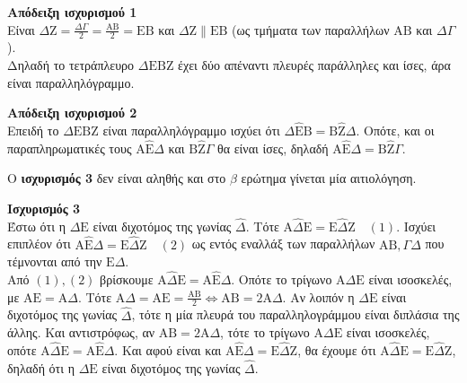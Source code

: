 \begin{alist}
    \item \textbf{Απόδειξη ισχυρισμού 1}\\
    Είναι $\Delta\mathrm{Z} = \frac{\Delta\Gamma}{2} = \frac{\mathrm{A}\mathrm{B}}{2} = \mathrm{E}\mathrm{B}$ και $\Delta\mathrm{Z} \parallel \mathrm{E}\mathrm{B}$ (ως τμήματα των παραλλήλων $\mathrm{A}\mathrm{B}$ και $\Delta\Gamma$).\\
    Δηλαδή το τετράπλευρο $\Delta\mathrm{E}\mathrm{B}\mathrm{Z}$ έχει δύο απέναντι πλευρές παράλληλες και ίσες, άρα είναι παραλληλόγραμμο.
    
    
    \textbf{Απόδειξη ισχυρισμού 2}\\
    Επειδή το $\Delta\mathrm{E}\mathrm{B}\mathrm{Z}$ είναι παραλληλόγραμμο ισχύει ότι $\Delta\hat{\mathrm{E}}\mathrm{B} = \mathrm{B}\hat{\mathrm{Z}}\Delta$. Οπότε, και οι παραπληρωματικές τους $\mathrm{A}\hat{\mathrm{E}}\Delta$ και $\mathrm{B}\hat{\mathrm{Z}}\Gamma$ θα είναι ίσες, δηλαδή $\mathrm{A}\hat{\mathrm{E}}\Delta = \mathrm{B}\hat{\mathrm{Z}}\Gamma$.
    
    Ο \textbf{ισχυρισμός 3} δεν είναι αληθής και στο $\beta$ ερώτημα γίνεται μία αιτιολόγηση.
    
    \item \textbf{Ισχυρισμός 3}\\
    Έστω ότι η $\Delta\mathrm{E}$ είναι διχοτόμος της γωνίας $\hat{\Delta}$. Τότε $\mathrm{A}\hat{\Delta}\mathrm{E} = \mathrm{E}\hat{\Delta}\mathrm{Z} \quad (1)$. Ισχύει επιπλέον ότι $\mathrm{A}\hat{\mathrm{E}}\Delta = \mathrm{E}\hat{\Delta}\mathrm{Z} \quad (2)$ ως εντός εναλλάξ των παραλλήλων $\mathrm{A}\mathrm{B}, \Gamma\Delta$ που τέμνονται από την $\mathrm{E}\Delta$. \\
    Από $(1), (2)$ βρίσκουμε $\mathrm{A}\hat{\Delta}\mathrm{E} = \mathrm{A}\hat{\mathrm{E}}\Delta$. Οπότε το τρίγωνο $\mathrm{A}\Delta\mathrm{E}$ είναι ισοσκελές, με $\mathrm{A}\mathrm{E} = \mathrm{A}\Delta$.
    Τότε $\mathrm{A}\Delta = \mathrm{A}\mathrm{E} = \frac{\mathrm{A}\mathrm{B}}{2} \Leftrightarrow \mathrm{A}\mathrm{B} = 2\mathrm{A}\Delta$. Αν λοιπόν η $\Delta\mathrm{E}$ είναι διχοτόμος της γωνίας $\hat{\Delta}$, τότε η μία πλευρά του παραλληλογράμμου είναι διπλάσια της άλλης. Και αντιστρόφως, αν $\mathrm{A}\mathrm{B} = 2\mathrm{A}\Delta$, τότε το τρίγωνο $\mathrm{A}\Delta\mathrm{E}$ είναι ισοσκελές, οπότε $\mathrm{A}\hat{\Delta}\mathrm{E} = \mathrm{A}\hat{\mathrm{E}}\Delta$. Και αφού είναι και $\mathrm{A}\hat{\mathrm{E}}\Delta = \mathrm{E}\hat{\Delta}\mathrm{Z}$, θα έχουμε ότι $\mathrm{A}\hat{\Delta}\mathrm{E} = \mathrm{E}\hat{\Delta}\mathrm{Z}$, δηλαδή ότι η $\Delta\mathrm{E}$ είναι διχοτόμος της γωνίας $\hat{\Delta}$.
\end{alist}

